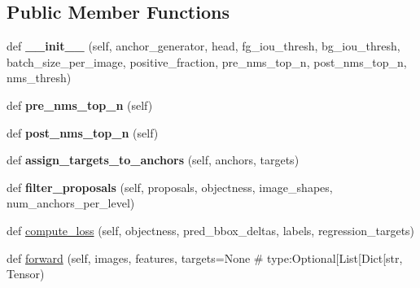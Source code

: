 \subsection*{Public Member Functions}
\begin{DoxyCompactItemize}
\item 
\mbox{\label{classtorchvision_1_1models_1_1detection_1_1rpn_1_1RegionProposalNetwork_ab751dd7e0875dd92b06c414d64f008bb}} 
def {\bfseries \+\_\+\+\_\+init\+\_\+\+\_\+} (self, anchor\+\_\+generator, head, fg\+\_\+iou\+\_\+thresh, bg\+\_\+iou\+\_\+thresh, batch\+\_\+size\+\_\+per\+\_\+image, positive\+\_\+fraction, pre\+\_\+nms\+\_\+top\+\_\+n, post\+\_\+nms\+\_\+top\+\_\+n, nms\+\_\+thresh)
\item 
\mbox{\label{classtorchvision_1_1models_1_1detection_1_1rpn_1_1RegionProposalNetwork_a100c769b28a98119060ca3c2220367f4}} 
def {\bfseries pre\+\_\+nms\+\_\+top\+\_\+n} (self)
\item 
\mbox{\label{classtorchvision_1_1models_1_1detection_1_1rpn_1_1RegionProposalNetwork_a6e0211bb42200aa656cc99d5474bed69}} 
def {\bfseries post\+\_\+nms\+\_\+top\+\_\+n} (self)
\item 
\mbox{\label{classtorchvision_1_1models_1_1detection_1_1rpn_1_1RegionProposalNetwork_a1367b1c0c203114637b6775824a60ce4}} 
def {\bfseries assign\+\_\+targets\+\_\+to\+\_\+anchors} (self, anchors, targets)
\item 
\mbox{\label{classtorchvision_1_1models_1_1detection_1_1rpn_1_1RegionProposalNetwork_abb245ed6cf90b372d460ec7d6431004e}} 
def {\bfseries filter\+\_\+proposals} (self, proposals, objectness, image\+\_\+shapes, num\+\_\+anchors\+\_\+per\+\_\+level)
\item 
def \hyperlink{classtorchvision_1_1models_1_1detection_1_1rpn_1_1RegionProposalNetwork_a900fa618bdc5e343a019476e6302b071}{compute\+\_\+loss} (self, objectness, pred\+\_\+bbox\+\_\+deltas, labels, regression\+\_\+targets)
\item 
def \hyperlink{classtorchvision_1_1models_1_1detection_1_1rpn_1_1RegionProposalNetwork_ae036b9541f9cc96bd617295b401c0cef}{forward} (self, images, features, targets=None \# type\+:\+Optional\mbox{[}List\mbox{[}Dict\mbox{[}str, Tensor)
\end{DoxyCompactItemize}
